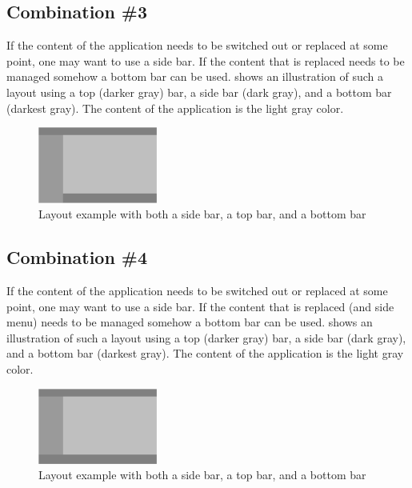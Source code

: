 \FloatBarrier

\subsection{Combination \#3}
If the content of the application needs to be switched out or replaced at some point, one may want to use a side bar. If the content that is replaced needs to be managed somehow a bottom bar can be used.  shows an illustration of such a layout using a top (darker gray) bar, a side bar (dark gray), and a bottom bar (darkest gray). The content of the application is the light gray color.

\begin{figure}[!htbp]
    \centering
    \includegraphics[width=0.35\textwidth]{pictures/application_structure/bar_combinations_3}
    \caption{Layout example with both a side bar, a top bar, and a bottom bar}
    \label{fig:bar_combinations_3}
\end{figure}

\FloatBarrier

\subsection{Combination \#4}
If the content of the application needs to be switched out or replaced at some point, one may want to use a side bar. If the content that is replaced (and side menu) needs to be managed somehow a bottom bar can be used.  shows an illustration of such a layout using a top (darker gray) bar, a side bar (dark gray), and a bottom bar (darkest gray). The content of the application is the light gray color.

\begin{figure}[!htbp]
    \centering
    \includegraphics[width=0.35\textwidth]{pictures/application_structure/bar_combinations_4}
    \caption{Layout example with both a side bar, a top bar, and a bottom bar}
    \label{fig:bar_combinations_4}
\end{figure}




